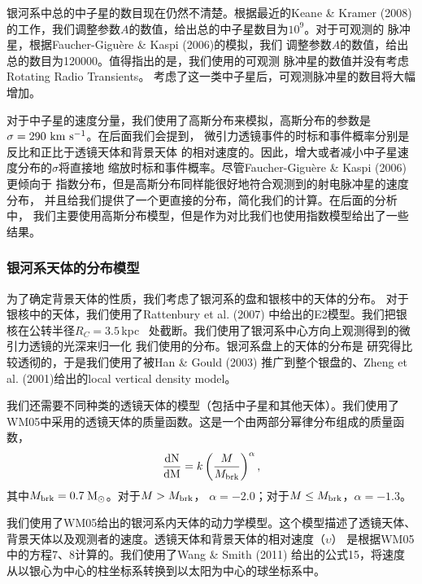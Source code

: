 银河系中总的中子星的数目现在仍然不清楚。根据最近的Keane \& Kramer (2008)\supercite{Keane}
的工作，我们调整参数$A$的数值，给出总的中子星数目为$10^9$。对于可观测的
脉冲星，根据Faucher-Gigu{\`e}re \& Kaspi (2006)\supercite{Faucher}的模拟，我们
调整参数$A$的数值，给出总的数目为120000。值得指出的是，我们使用的可观测
脉冲星的数值并没有考虑Rotating Radio Transients\supercite{McLaughlin06}。
考虑了这一类中子星后，可观测脉冲星的数目将大幅增加\supercite{Keane}。

对于中子星的速度分量，我们使用了高斯分布来模拟，高斯分布的参数是
$\sigma=290\ \rm{km\ s^{-1}}$\supercite{Faucher}。在后面我们会提到，
微引力透镜事件的时标和事件概率分别是反比和正比于透镜天体和背景天体
的相对速度的。因此，增大或者减小中子星速度分布的$\sigma$将直接地
缩放时标和事件概率。尽管Faucher-Gigu{\`e}re \& Kaspi (2006)更倾向于
指数分布，但是高斯分布同样能很好地符合观测到的射电脉冲星的速度分布\supercite{hobbs}，
并且给我们提供了一个更直接的分布，简化我们的计算。在后面的分析中，
我们主要使用高斯分布模型，但是作为对比我们也使用指数模型给出了一些
结果。

\subsubsection{银河系天体的分布模型}

为了确定背景天体的性质，我们考虑了银河系的盘和银核中的天体的分布。
对于银核中的天体，我们使用了Rattenbury et al. (2007)\supercite{Rattenbury}
中给出的E2模型。我们把银核在公转半径$R_{C}=3.5$\,kpc~\supercite{Bissantz}
处截断。我们使用了银河系中心方向上观测得到的微引力透镜的光深来归一化
我们使用的分布\supercite{Calchi,popowski}。银河系盘上的天体的分布是
研究得比较透彻的，于是我们使用了被Han \& Gould (2003)\supercite{han}
推广到整个银盘的、Zheng et al. (2001)\supercite{zheng}给出的local vertical 
density model。

我们还需要不同种类的透镜天体的模型（包括中子星和其他天体）。我们使用了
WM05中采用的透镜天体的质量函数。这是一个由两部分幂律分布组成的质量函数，
%
\begin{equation}
\frac{\rm{d}N}{\rm{d}M}=k\left(\frac{M}{M_{\rm{brk}}}\right)^{\rm{\alpha}},
\end{equation}
%
其中$M_{\rm{brk}}=0.7$\,$\rm{M_{\odot}}$。对于$M>M_{\rm{brk}}$，
$\alpha=-2.0$；对于$M\leq M_{\rm{brk}}$，$\alpha=-1.3$。

我们使用了WM05给出的银河系内天体的动力学模型。这个模型描述了透镜天体、
背景天体以及观测者的速度。透镜天体和背景天体的相对速度（$\upsilon$）
是根据WM05中的方程7、8计算的。我们使用了Wang \& Smith (2011)\supercite{wang}
给出的公式15，将速度从以银心为中心的柱坐标系转换到以太阳为中心的球坐标系中。

